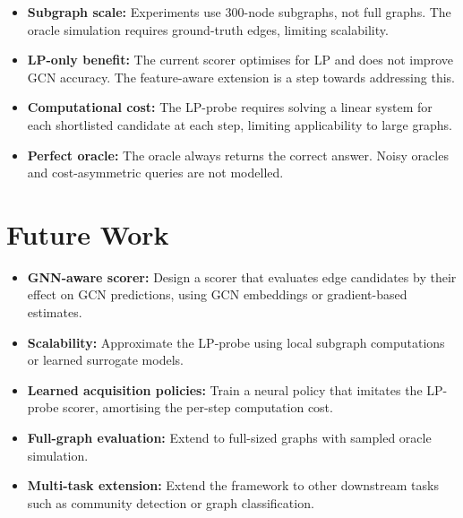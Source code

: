 \documentclass[12pt,a4paper,oneside]{report}
\begin{document}
\begin{itemize}[leftmargin=2em]
    \item \textbf{Subgraph scale:} Experiments use 300-node subgraphs, not full graphs. The oracle simulation requires ground-truth edges, limiting scalability.

    \item \textbf{LP-only benefit:} The current scorer optimises for LP and does not improve GCN accuracy. The feature-aware extension is a step towards addressing this.

    \item \textbf{Computational cost:} The LP-probe requires solving a linear system for each shortlisted candidate at each step, limiting applicability to large graphs.

    \item \textbf{Perfect oracle:} The oracle always returns the correct answer. Noisy oracles and cost-asymmetric queries are not modelled.
\end{itemize}

\section{Future Work}

\begin{itemize}[leftmargin=2em]
    \item \textbf{GNN-aware scorer:} Design a scorer that evaluates edge candidates by their effect on GCN predictions, using GCN embeddings or gradient-based estimates.

    \item \textbf{Scalability:} Approximate the LP-probe using local subgraph computations or learned surrogate models.

    \item \textbf{Learned acquisition policies:} Train a neural policy that imitates the LP-probe scorer, amortising the per-step computation cost.

    \item \textbf{Full-graph evaluation:} Extend to full-sized graphs with sampled oracle simulation.

    \item \textbf{Multi-task extension:} Extend the framework to other downstream tasks such as community detection or graph classification.
\end{itemize}
\end{document}
